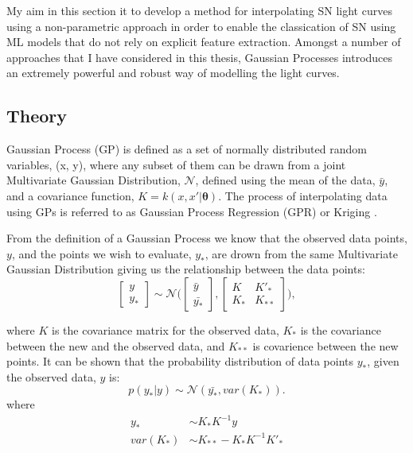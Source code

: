 My aim in this section it to develop a method for interpolating SN light curves using a non-parametric approach in order to enable the classication of SN using ML models that do not rely on explicit feature extraction. Amongst a number of approaches that I have considered in this thesis, Gaussian Processes introduces an extremely powerful and robust way of modelling the light curves.

\subsection{Theory}
Gaussian Process (GP) \citep{Rasmussen2006} is defined as a set of normally distributed random variables, (x, y), where any subset of them can be drawn from a joint Multivariate Gaussian Distribution, $\mathcal{N}$, defined using the mean of the data, $\bar{y}$, and a covariance function, $K = k(x, x'|\mathbf{\theta})$. The process of interpolating data using GPs is referred to as Gaussian Process Regression (GPR) or Kriging \citep{krige1951,Rasmussen2006,Ebden2015}.

From the definition of a Gaussian Process we know that the observed data points, $y$, and the points we wish to evaluate, $y_*$, are drown from the same Multivariate Gaussian Distribution giving us the relationship between the data points:
\begin{equation}
\begin{bmatrix} y \\ y_* \end{bmatrix} \sim \mathcal{N}\Biggl(\begin{bmatrix} \bar{y} \\ \bar{y_*} \end{bmatrix},\begin{bmatrix} K & K'_*\\
 K_* & K_{**} \end{bmatrix}\Biggr),
\end{equation}

\noindent where $K$ is the covariance matrix for the observed data, $K_*$ is the covariance between the new and the observed data, and $K_{**}$ is covarience between the new points. It can be shown \citep{Rasmussen2006} that the probability distribution of data points $y_*$, given the observed data, $y$ is:
\begin{equation}
p(y_*|y) \sim \mathcal{N}(\bar{y_*},var(K_*)).
\end{equation}
\noindent where
\begin{align}
y_* &\sim K_*K^{-1}y \\
var(K_*) &\sim K_{**}-K_*K^{-1}K'_*
\end{align}

